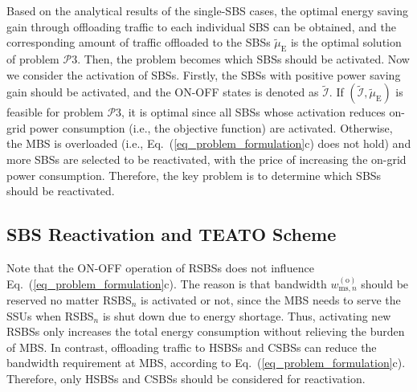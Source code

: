 \documentclass[12pt, draftclsnofoot,onecolumn]{IEEEtran}
\begin{document}
Based on the analytical results of the single-SBS cases, the optimal energy saving gain through offloading traffic to each individual SBS can be obtained, and the corresponding amount of traffic offloaded to the SBSs $\tilde{\mu}_\mathrm{E}$ is the optimal solution of problem $\mathcal{P}3$.
Then, the problem becomes which SBSs should be activated.
Now we consider the activation of SBSs.
Firstly, the SBSs with positive power saving gain should be activated, and the ON-OFF states is denoted as $\tilde{\mathcal{I}}$.
If $(\tilde{\mathcal{I}},\tilde{\mu}_\mathrm{E})$ is feasible for problem $\mathcal{P}3$, it is optimal since all SBSs whose activation reduces on-grid power consumption (i.e., the objective function) are activated.
Otherwise, the MBS is overloaded (i.e., Eq.~(\ref{eq_problem_formulation}c) does not hold) and more SBSs are selected to be reactivated, with the price of increasing the on-grid power consumption.
Therefore, the key problem is to determine which SBSs should be reactivated.

\subsection{SBS Reactivation and TEATO Scheme}

Note that the ON-OFF operation of RSBSs does not influence Eq.~(\ref{eq_problem_formulation}c).
The reason is that bandwidth $w_{\mathrm{ms},n}^{(\mathrm{o})}$ should be reserved no matter RSBS$_n$ is activated or not, since the MBS needs to serve the SSUs when RSBS$_n$ is shut down due to energy shortage.
Thus, activating new RSBSs only increases the total energy consumption without relieving the burden of MBS.
In contrast, offloading traffic to HSBSs and CSBSs can reduce the bandwidth requirement at MBS, according to Eq.~(\ref{eq_problem_formulation}c).
Therefore, only HSBSs and CSBSs should be considered for reactivation.
\end{document}
